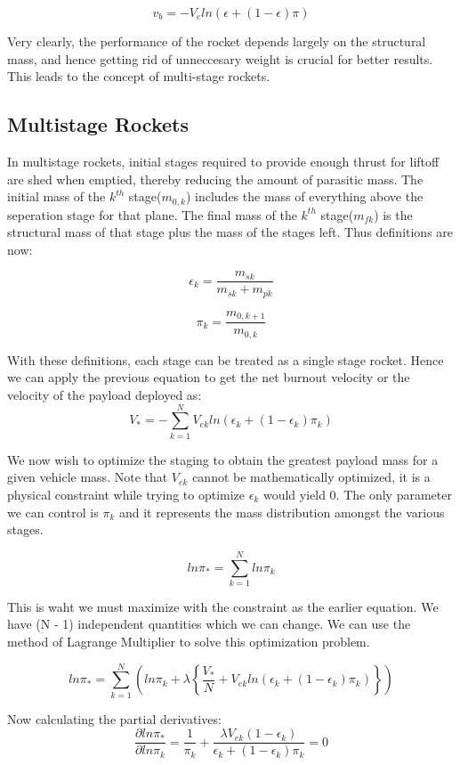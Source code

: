 \documentclass[12pt, letterpaper]{article}
\begin{document}
\[
	v_b = -V_eln(\epsilon + (1-\epsilon) \pi)
\]

Very clearly, the performance of the rocket depends largely on the structural mass, and hence getting rid of unneccesary weight is crucial for better results. This leads to the concept of multi-stage rockets.

\subsection{Multistage Rockets}
In multistage rockets, initial stages required to provide enough thrust for liftoff are shed when emptied, thereby reducing the amount of parasitic mass. The initial mass of the $k^{th}$ stage($m_{0,k} $) includes the mass of everything above the seperation stage for that plane. The final mass of the $k^{th}$ stage($m_{fk} $) is the structural mass of that stage plus the mass of the stages left. Thus definitions are now:

\[
	\epsilon_k = \frac{m_{sk}}{m_{sk} + m_{pk}}
\] 

\[
	\pi_k = \frac{m_{0,k+1}}{m_{0,k}}
\]

With these definitions, each stage can be treated as a single stage rocket. Hence we can apply the previous equation to get the net burnout velocity or the velocity of the payload deployed as:
\[
	V_* = - \sum_{k=1}^{N} V_{ek}ln(\epsilon_k + (1-\epsilon_k) \pi_k)
\]

We now wish to optimize the staging to obtain the greatest payload mass for a given vehicle mass. Note that $V_{ek}$ cannot be mathematically optimized, it is a physical constraint while trying to optimize $\epsilon_{k}$ would yield $0$. The only parameter we can control is $\pi_k$ and it represents the mass distribution amongst the various stages.

\[
	ln\pi_* = \sum_{k=1}^{N} ln\pi_k
\]

This is waht we must maximize with the constraint as the earlier equation. We have (N - 1) independent quantities which we can change. We can use the method of Lagrange Multiplier to solve this optimization problem.

\[
	ln\pi_* = \sum_{k=1}^{N}\left( ln\pi_k + \lambda \left\{ \frac{V_*}{N} + V_{ek}ln(\epsilon_k + (1-\epsilon_k) \pi_k) \right\} \right) 
\]

Now calculating the partial derivatives:
\[
	\frac{\partial ln\pi_*}{\partial ln\pi_k} = \frac{1}{\pi_k} + \frac{\lambda V_{ek}(1 - \epsilon_k)}{\epsilon_k + (1-\epsilon_k) \pi_k} = 0
\]
\end{document}
